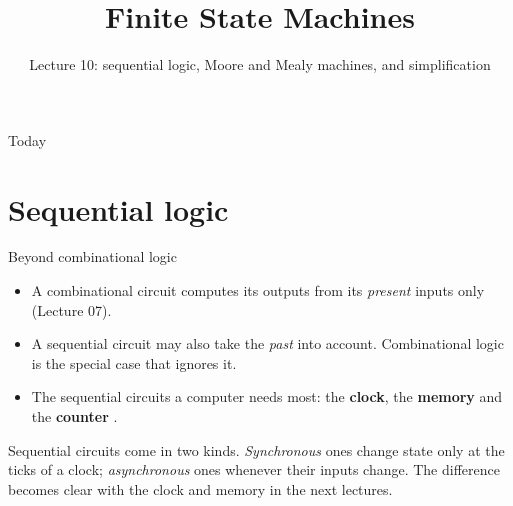 \documentclass[10pt]{wosm-slides}
\title[Lecture 10 \textperiodcentered\ Finite State Machines]{Finite State Machines}
\subtitle{Lecture 10: sequential logic, Moore and Mealy machines, and simplification}
\begin{document}
\maketitle

\begin{frame}{Today}
  \tableofcontents
\end{frame}

\section{Sequential logic}

\begin{frame}{Beyond combinational logic}
  \begin{itemize}
    \item A combinational circuit computes its outputs from its \emph{present}
      inputs only (Lecture 07).
    \item A \alert{sequential} circuit may also take the \emph{past} into account.
      Combinational logic is the special case that ignores it.
    \item The sequential circuits a computer needs most: the \textbf{clock}, the
      \textbf{memory} and the \textbf{counter} .
  \end{itemize}

  \bigskip
  \begin{remark}
    Sequential circuits come in two kinds. \emph{Synchronous} ones change state only
    at the ticks of a clock; \emph{asynchronous} ones whenever their inputs change.
    The difference becomes clear with the clock and memory in the next lectures.
  \end{remark}
\end{frame}
\end{document}
